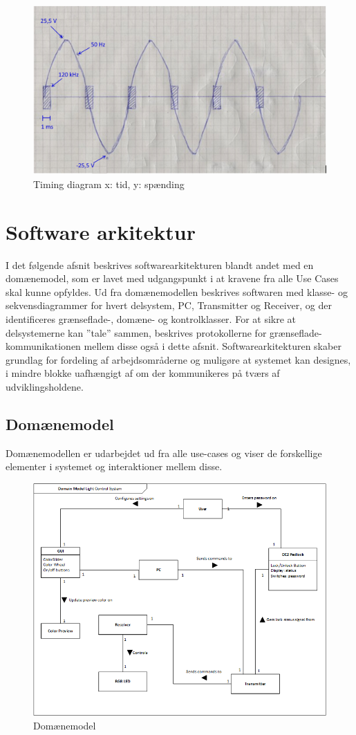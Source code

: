 \documentclass[oneside]{memoir}
\begin{document}
\begin{figure}[H]
\centering
\includegraphics[width=0.7\linewidth]{"billeder til latex/timing"}
\caption{Timing diagram x: tid, y: spænding}
\label{fig:timing}
\end{figure}
\newpage
\section{Software arkitektur}
I det følgende afsnit beskrives softwarearkitekturen blandt andet med en domænemodel, som er lavet med udgangspunkt i at kravene fra alle Use Cases skal kunne opfyldes. Ud fra domænemodellen beskrives softwaren med klasse- og sekvensdiagrammer for hvert delsystem, PC, Transmitter og Receiver, og der identificeres grænseflade-, domæne- og kontrolklasser. For at sikre at delsystemerne kan ”tale” sammen, beskrives protokollerne for grænseflade-kommunikationen mellem disse også i dette afsnit. Softwarearkitekturen skaber grundlag for fordeling af arbejdsområderne og muligøre at systemet kan designes, i mindre blokke uafhængigt af om der kommunikeres på tværs af udviklingsholdene.

\subsection{Domænemodel}
Domænemodellen er udarbejdet ud fra alle use-cases og viser de forskellige elementer i systemet og interaktioner mellem disse.

\begin{figure}[H]
\centering
\includegraphics[width=0.8\linewidth]{"billeder til latex/Domain"}
\caption{Domænemodel}
\label{fig:Domain}
\end{figure}
\end{document}
